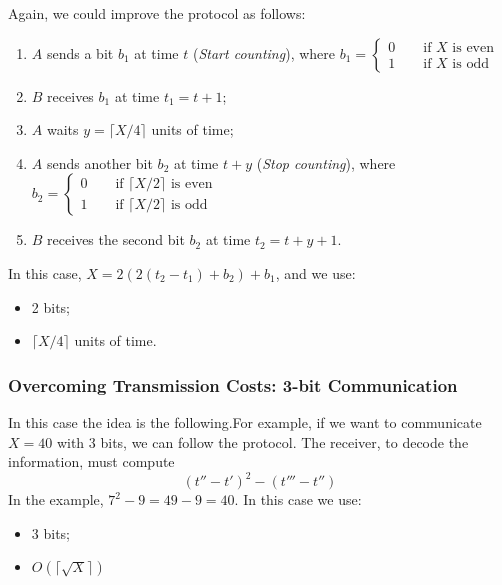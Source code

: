 
Again, we could improve the protocol as follows:
\begin{enumerate}
    \item $A$ sends a bit $b_1$ at time $t$ (\textit{Start counting}), where $b_1 = \begin{cases}
        0 \qquad \text{if } X \text{ is even} \\
        1 \qquad \text{if } X \text{ is odd}
    \end{cases}$
    \item $B$ receives $b_1$ at time $t_1 = t+1$;
    \item $A$ waits $y = \lceil X/4 \rceil$ units of time;
    \item $A$ sends another bit $b_2$ at time $t+y$ (\textit{Stop counting}), where $b_2 = \begin{cases}
        0 \qquad \text{if } \lceil X/2 \rceil \text{ is even} \\
        1 \qquad \text{if } \lceil X/2 \rceil \text{ is odd}
    \end{cases}$
    \item $B$ receives the second bit $b_2$ at time $t_2 = t+y+1$.
\end{enumerate}

In this case, $X = 2(2(t_2-t_1)+b_2)+b_1$, and we use:
\begin{itemize}
    \item 2 bits;
    \item $\lceil X/4 \rceil$ units of time.
\end{itemize}

\subsubsection{Overcoming Transmission Costs: 3-bit Communication}
In this case the idea is the following.For example, if we want to communicate $X = 40$ with 3 bits, we can follow the protocol.
The receiver, to decode the information, must compute
$$
(t''-t')^2 - (t''' - t'')
$$
In the example, $7^2-9 = 49-9 = 40$. In this case we use:
\begin{itemize}
    \item 3 bits;
    \item $O(\lceil\sqrt{X}\rceil)$
\end{itemize}


